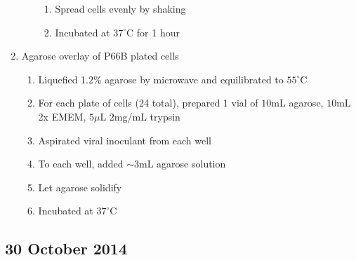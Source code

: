 \begin{enumerate}
\begin{enumerate}
\begin{enumerate}
					\item Spread cells evenly by shaking
					\item Incubated at $37^{\circ}$C for 1 hour
				\end{enumerate}
		\end{enumerate}
	\item Agarose overlay of P66B plated cells
		\begin{enumerate}
			\item Liquefied 1.2\% agarose by microwave and equilibrated to $55^{\circ}$C
			\item For each plate of cells (24 total), prepared 1 vial of $10$mL agarose, $10$mL 2x EMEM, $5\mu$L $2$mg/mL trypsin
			\item Aspirated viral inoculant from each well
			\item To each well, added $\sim3$mL agarose solution
			\item Let agarose solidify
			\item Incubated at $37^{\circ}$C
		\end{enumerate}
\end{enumerate}

\subsection*{30 October 2014}

